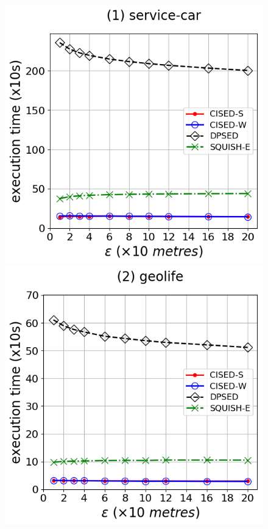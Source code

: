 {\begin{figure}[tb!]
\centering
\includegraphics[scale = 0.290]{Figures/Exp-time-epsilon-service.png}\hspace{1ex}
\includegraphics[scale = 0.290]{Figures/Exp-time-epsilon-geolife.png}\hspace{1ex}

\end{figure}}
